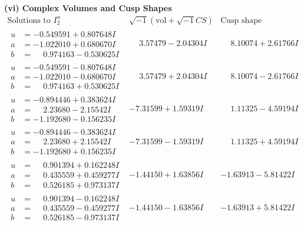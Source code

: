 \documentclass[1p]{elsarticle_modified}
\theoremstyle{definition}
\newcommand{\I}{\sqrt{-1}}
\begin{document}
\newpage\flushleft \textbf{(vi) Complex Volumes and Cusp Shapes}
$$\begin{array}{c|c|c}  
\text{Solutions to }I^u_{2}& \I (\text{vol} + \sqrt{-1}CS) & \text{Cusp shape}\\
 \hline 
\begin{aligned}
u &= -0.549591 + 0.807648 I \\
a &= -1.022010 + 0.680670 I \\
b &= \phantom{-}0.974163 - 0.530625 I\end{aligned}
 & \phantom{-}3.57479 - 2.04304 I & \phantom{-}8.10074 + 2.61766 I \\ \hline\begin{aligned}
u &= -0.549591 - 0.807648 I \\
a &= -1.022010 - 0.680670 I \\
b &= \phantom{-}0.974163 + 0.530625 I\end{aligned}
 & \phantom{-}3.57479 + 2.04304 I & \phantom{-}8.10074 - 2.61766 I \\ \hline\begin{aligned}
u &= -0.894446 + 0.383624 I \\
a &= \phantom{-}2.23680 - 2.15542 I \\
b &= -1.192680 - 0.156235 I\end{aligned}
 & -7.31599 + 1.59319 I & \phantom{-}1.11325 - 4.59194 I \\ \hline\begin{aligned}
u &= -0.894446 - 0.383624 I \\
a &= \phantom{-}2.23680 + 2.15542 I \\
b &= -1.192680 + 0.156235 I\end{aligned}
 & -7.31599 - 1.59319 I & \phantom{-}1.11325 + 4.59194 I \\ \hline\begin{aligned}
u &= \phantom{-}0.901394 + 0.162248 I \\
a &= \phantom{-}0.435559 + 0.459277 I \\
b &= \phantom{-}0.526185 + 0.973137 I\end{aligned}
 & -1.44150 + 1.63856 I & -1.63913 - 5.81422 I \\ \hline\begin{aligned}
u &= \phantom{-}0.901394 - 0.162248 I \\
a &= \phantom{-}0.435559 - 0.459277 I \\
b &= \phantom{-}0.526185 - 0.973137 I\end{aligned}
 & -1.44150 - 1.63856 I & -1.63913 + 5.81422 I \\ \hline\begin{aligned}

\end{aligned}
\end{array}$$
\end{document}
